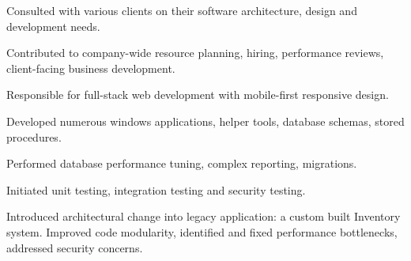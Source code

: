 \documentclass[letterpaper]{deedy-resume} %
\begin{document}
\begin{minipage}[t]{0.66\textwidth}
\begin{tightitemize}
\item Consulted with various clients on their software architecture, design and development needs.
\item Contributed to company-wide resource planning, hiring, performance reviews, client-facing business development.
\item Responsible for full-stack web development with mobile-first responsive design.
\item Developed numerous windows applications, helper tools, database schemas, stored procedures.
\item Performed database performance tuning, complex reporting, migrations.
\item Initiated unit testing, integration testing and security testing.
\item Introduced architectural change into legacy application: a custom built Inventory system. Improved code modularity, identified and fixed performance bottlenecks, addressed security concerns.
\end{tightitemize}

\sectionspace %




\sectionspace %




\sectionspace %




\sectionspace %




\end{minipage}
\end{document}
